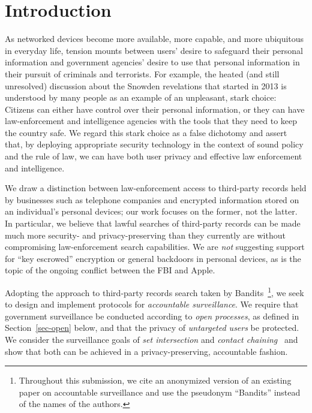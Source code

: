 \section{Introduction}\label{sec-introduction}
As networked devices become more available, more capable, and more ubiquitous
in everyday life, tension mounts between users' desire to safeguard their 
personal information and government agencies' desire to use that personal 
information in their pursuit of criminals and terrorists.  For example, 
the heated (and still unresolved) discussion about the Snowden 
revelations that started in 2013 is understood by many people
as an example of an unpleasant, stark choice: Citizens can either have
control over their personal information, or they can have
law-enforcement and intelligence agencies with the tools that they need to
keep the country safe. We regard this stark choice as a false dichotomy and 
assert that, by deploying appropriate security technology in the context of 
sound policy and the rule of law, we can have both user privacy and effective 
law enforcement and intelligence.

We draw a distinction between law-enforcement access to
third-party records held by businesses such as telephone companies
and encrypted information stored on an individual's personal devices;
our work focuses on the former, not the latter.
In particular, we believe that lawful searches of third-party records
can be made much more security- and privacy-preserving than they currently are
without compromising law-enforcement search capabilities.
We are {\em not} suggesting support for ``key escrowed'' encryption
or general backdoors in personal devices,
as is the topic of the ongoing conflict between the FBI and Apple.

Adopting the approach to third-party records search
taken by Bandits~\cite{sff-foci2014}\footnote{Throughout this submission, we
cite an anonymized version of an existing paper on accountable surveillance
and use the pseudonym ``Bandits'' instead of the names of the authors.}, we
seek to design and implement protocols for {\it accountable surveillance}.
We require that government surveillance be conducted according to {\it open
processes}, as defined in Section~\ref{sec-open} below, and that the privacy
of {\it untargeted users} be protected.  We consider the surveillance goals
of {\it set intersection} and {\it contact chaining}~\cite{techdirt} and show that both can 
be achieved in a privacy-preserving, accountable fashion.

